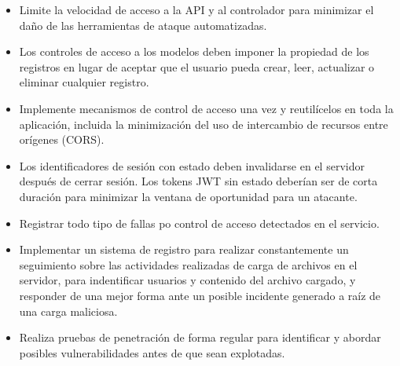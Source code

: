 \documentclass[12pt,oneside,a4paper]{book}
\begin{document}
\begin{enumerate}
\begin{itemize}
\vspace{1em}

\begin{itemize}
\item Limite la velocidad de acceso a la API y al controlador para minimizar el daño de las herramientas de ataque automatizadas.
\item Los controles de acceso a los modelos deben imponer la propiedad de los registros en lugar de aceptar que el usuario pueda crear, leer, actualizar o eliminar cualquier registro.
\item Implemente mecanismos de control de acceso una vez y reutilícelos en toda la aplicación, incluida la minimización del uso de intercambio de recursos entre orígenes (CORS).
\item Los identificadores de sesión con estado deben invalidarse en el servidor después de cerrar sesión. Los tokens JWT sin estado deberían ser de corta duración para minimizar la ventana de oportunidad para un atacante.
\item Registrar todo tipo de fallas po control de acceso detectados en el servicio.
\item Implementar un sistema de registro para realizar constantemente un seguimiento sobre las actividades realizadas de carga de archivos en el servidor, para indentificar usuarios y contenido del archivo cargado, y responder de una mejor forma ante un posible incidente generado a raíz de una carga maliciosa.
\item Realiza pruebas de penetración de forma regular para identificar y abordar posibles vulnerabilidades antes de que sean explotadas.
\end{itemize}
\end{itemize}

\newpage

\end{enumerate}
\end{document}
